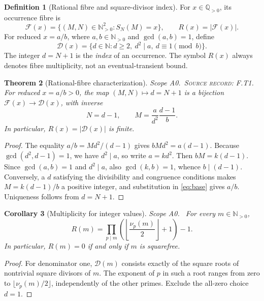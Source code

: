 \documentclass[11pt,oneside,openany]{book}
\newtheorem{theorem}{Theorem}[chapter]
\newtheorem{corollary}[theorem]{Corollary}
\theoremstyle{definition}
\newtheorem{definition}[theorem]{Definition}
\theoremstyle{remark}
\newcommand{\Q}{\mathbb{Q}}
\newcommand{\N}{\mathbb{N}}
\newcommand{\Fx}{\mathcal{F}}
\newcommand{\Dx}{\mathcal{D}}
\newcommand{\gcdop}{\operatorname{gcd}}
\newcommand{\scope}[1]{\textsf{\small Scope #1.}\ }
\newcommand{\record}[1]{\textup{\textsc{Source record: #1.}}\ }
\begin{document}
\begin{definition}[Rational fibre and square-divisor index]\label{def:fibre}
For \(x\in\Q_{>0}\), its occurrence fibre is
\[
 \Fx(x)=\{(M,N)\in\N_{>0}^2:S_N(M)=x\},\qquad R(x)=|\Fx(x)|.
\]
For reduced \(x=a/b\), where \(a,b\in\N_{>0}\) and \(\gcdop(a,b)=1\), define
\[
 \Dx(x)=\{d\in\N:d\ge2,\ d^2\mid a,\ d\equiv 1\pmod b\}.
\]
The integer \(d=N+1\) is the \emph{index} of an occurrence. The symbol \(R(x)\) always denotes fibre multiplicity, not an eventual-transient bound.
\end{definition}

\begin{theorem}[Rational-fibre characterization]\label{thm:fibre}
\scope{A0}\record{F.T1} For reduced \(x=a/b>0\), the map \((M,N)\mapsto d=N+1\) is a bijection \(\Fx(x)\to\Dx(x)\), with inverse
\begin{equation}\label{eq:occ-inverse}
 N=d-1,\qquad M=\frac{a}{d^2}\frac{d-1}{b}.
\end{equation}
In particular, \(R(x)=|\Dx(x)|\) is finite.
\end{theorem}
\begin{proof}
The equality \(a/b=Md^2/(d-1)\) gives
\(bMd^2=a(d-1)\). Because \(\gcdop(d^2,d-1)=1\), we have \(d^2\mid a\), so write \(a=kd^2\). Then \(bM=k(d-1)\). Since \(\gcdop(a,b)=1\) and \(d^2\mid a\), also \(\gcdop(k,b)=1\), whence \(b\mid(d-1)\). Conversely, a \(d\) satisfying the divisibility and congruence conditions makes \(M=k(d-1)/b\) a positive integer, and substitution in \eqref{eq:base} gives \(a/b\). Uniqueness follows from \(d=N+1\).
\end{proof}

\begin{corollary}[Multiplicity for integer values]\label{cor:mult}
\scope{A0} For every \(m\in\N_{>0}\),
\begin{equation}\label{eq:mult}
 R(m)=\prod_{p\mid m}\left(\left\lfloor\frac{\nu_p(m)}2\right\rfloor+1\right)-1.
\end{equation}
In particular, \(R(m)=0\) if and only if \(m\) is squarefree.
\end{corollary}
\begin{proof}
For denominator one, \(\Dx(m)\) consists exactly of the square roots of nontrivial square divisors of \(m\). The exponent of \(p\) in such a root ranges from zero to \(\lfloor\nu_p(m)/2\rfloor\), independently of the other primes. Exclude the all-zero choice \(d=1\).
\end{proof}
\end{document}
